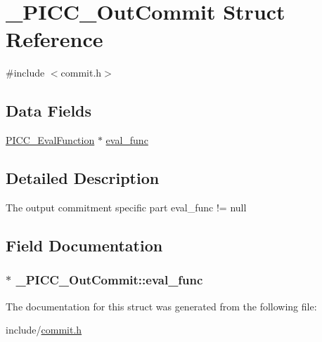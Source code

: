 \hypertarget{struct__PICC__OutCommit}{\section{\-\_\-\-P\-I\-C\-C\-\_\-\-Out\-Commit Struct Reference}
\label{struct__PICC__OutCommit}
}


{\ttfamily \#include $<$commit.\-h$>$}

\subsection*{Data Fields}
{\bf }\par
\begin{DoxyCompactItemize}
\item 
\hyperlink{commit_8h_ad2bb1ba499a64c4eb87962523a3957ab}{P\-I\-C\-C\-\_\-\-Eval\-Function} $\ast$ \hyperlink{struct__PICC__OutCommit_a598ca6a884ab33ac8e18a2236d19da5b}{eval\-\_\-func}
\end{DoxyCompactItemize}



\subsection{Detailed Description}
The output commitment specific part  eval\-\_\-func != null 

\subsection{Field Documentation}
\hypertarget{struct__PICC__OutCommit_a598ca6a884ab33ac8e18a2236d19da5b}{
\subsubsection[{eval\-\_\-func}]{$\ast$ \-\_\-\-P\-I\-C\-C\-\_\-\-Out\-Commit\-::eval\-\_\-func}}\label{struct__PICC__OutCommit_a598ca6a884ab33ac8e18a2236d19da5b}


The documentation for this struct was generated from the following file\-:\begin{DoxyCompactItemize}
\item 
include/\hyperlink{commit_8h}{commit.\-h}\end{DoxyCompactItemize}
